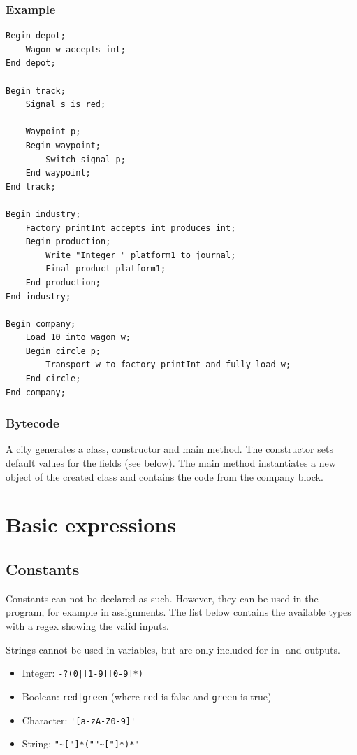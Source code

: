 \documentclass[10pt,a4paper]{article}
\newcommand{\code}[1]{{\ttfamily\small #1}}
\begin{document}
\subsubsection*{Example}

\begin{lstlisting}
Begin depot;
	Wagon w accepts int;
End depot;

Begin track;
	Signal s is red;

	Waypoint p;
	Begin waypoint;
		Switch signal p;
	End waypoint;
End track;

Begin industry;
	Factory printInt accepts int produces int;
	Begin production;
		Write "Integer " platform1 to journal;
		Final product platform1;
	End production;
End industry;

Begin company;
	Load 10 into wagon w;
	Begin circle p;
		Transport w to factory printInt and fully load w;
	End circle;
End company;
\end{lstlisting}

\subsubsection*{Bytecode}

A city generates a class, constructor and main method. The constructor sets default values for the fields (see below). The main method instantiates a new object of the created class and contains the code from the \code{company} block.

\section{Basic expressions}

\subsection{Constants}

Constants can not be declared as such. However, they can be used in the program, for example in assignments. The list below contains the available types with a regex showing the valid inputs.

Strings cannot be used in variables, but are only included for in- and outputs.

\begin{itemize}
\item Integer: \verb=-?(0|[1-9][0-9]*)=
\item Boolean: \verb=red|green= (where \verb|red| is false and \verb|green| is true)
\item Character: \verb='[a-zA-Z0-9]'=
\item String: \verb="~["]*(""~["]*)*"=
\end{itemize}
\end{document}
